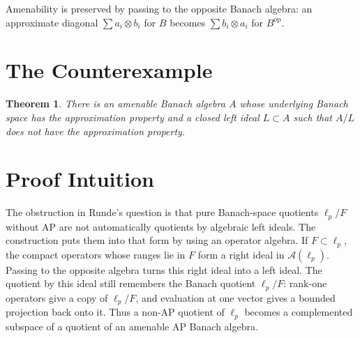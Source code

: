 \documentclass[11pt]{article}
\newtheorem{theorem}{Theorem}
\newcommand{\A}{\mathcal A}
\newcommand{\op}{\mathrm{op}}
\begin{document}
Amenability is preserved by passing to the opposite Banach algebra: an
approximate diagonal \(\sum a_i\otimes b_i\) for \(B\) becomes
\(\sum b_i\otimes a_i\) for \(B^{\op}\).

\section*{The Counterexample}

\begin{theorem}
There is an amenable Banach algebra \(A\) whose underlying Banach space has the
approximation property and a closed left ideal \(L\subset A\) such that
\(A/L\) does not have the approximation property.
\end{theorem}

\section*{Proof Intuition}

The obstruction in Runde's question is that pure Banach-space quotients
\(\ell_p/F\) without AP are not automatically quotients by algebraic left
ideals. The construction puts them into that form by using an operator algebra.
If \(F\subset \ell_p\), the compact operators whose ranges lie in \(F\) form a
right ideal in \(\A(\ell_p)\). Passing to the opposite algebra turns this right
ideal into a left ideal. The quotient by this ideal still remembers the Banach
quotient \(\ell_p/F\): rank-one operators give a copy of \(\ell_p/F\), and
evaluation at one vector gives a bounded projection back onto it. Thus a
non-AP quotient of \(\ell_p\) becomes a complemented subspace of a quotient of
an amenable AP Banach algebra.
\end{document}
